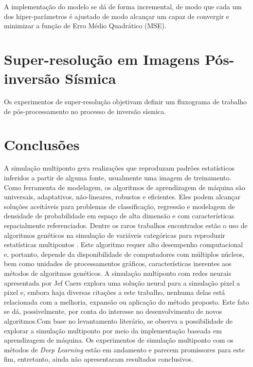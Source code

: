 \documentclass[11pt]{article}
\begin{document}
A implementação do modelo se dá de forma incremental, de modo que cada um dos
hiper-parâmetros é ajustado de modo alcançar um capaz de convergir e minimizar
a função de Erro Médio Quadrático (MSE).



\section{Super-resolução em Imagens Pós-inversão Sísmica}
Os experimentos de super-resolução objetivam definir um fluxograma de trabalho de
pós-processamento no processo de inversão sísmica. 

\section{Conclusões}
A simulação multiponto gera realizações que reproduzam padrões estatísticos inferidos a partir de alguma fonte, usualmente uma imagem de treinamento. 
Como ferramenta de modelagem, os algoritmos de aprendizagem de máquina são universais, adaptativos, não-lineares, robustos e eficientes. 
Eles podem alcançar soluções aceitáveis para problemas de classificação, regressão e modelagem de densidade de probabilidade em espaço de alta dimensão 
e com características espacialmente referenciados. Dentre os raros trabalhos encontrados estão o uso de algoritmos genéticos na simulação de variáveis
categóricas para reproduzir estatísticas multipontos \cite{Peredo2012}. Este algoritmo 
requer alto desempenho computacional e, portanto, depende da disponibilidade de computadores com múltiplos núcleos, bem como unidades de processamentos 
gráficos, características inerentes aos métodos de algoritmos genéticos. A simulação multiponto com redes neurais apresentada por Jef Caers \cite{caers_1998} explora uma 
solução neural para a simulação pixel a pixel e, embora haja diversas citações a este trabalho, nenhuma delas está relacionada com a melhoria, expansão 
ou aplicação do método proposto. Este fato se dá, possivelmente, por conta do interesse no desenvolvimento de novos algoritmos.Com base no levantamento literário, se observa a possibilidade de explorar a simulação multiponto por meio da 
implementação baseada em aprendizagem de máquina. Os experimentos de simulação multiponto com os métodos de \textit{Deep Learning} estão em andamento e
parecem promissores para este fim, entretanto, ainda não apresentaram resultados conclusivos.

\nocite{*}

\begin{spacing}{1}
   
   
 \end{spacing}
\end{document}
